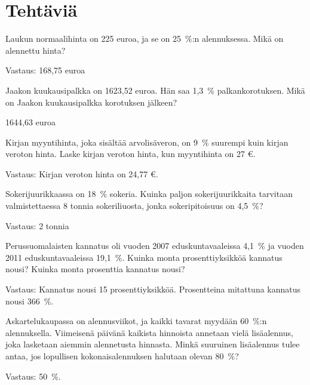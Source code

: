 \section*{Tehtäviä}

\begin{tehtava}
    Laukun normaalihinta on 225 euroa, ja se on 25~\%:n alennuksessa.
    Mikä on alennettu hinta?
    \begin{vastaus}
    Vastaus: 168,75 euroa
    \end{vastaus}
\end{tehtava}

\begin{tehtava}
    Jaakon kuukausipalkka on 1623,52 euroa. Hän saa 1,3~\% palkankorotuksen.
    Mikä on Jaakon kuukausipalkka korotuksen jälkeen?
    \begin{vastaus}
    1644,63 euroa
    \end{vastaus}
\end{tehtava}

\begin{tehtava}
    Kirjan myyntihinta, joka sisältää arvolisäveron, on 9~\% suurempi kuin kirjan veroton hinta. Laske kirjan veroton hinta, kun myyntihinta on 27 \euro.
    \begin{vastaus}
        Vastaus: Kirjan veroton hinta on 24,77 \euro.
    \end{vastaus}
\end{tehtava}

\begin{tehtava}
	Sokerijuurikkaassa on 18~\% sokeria. Kuinka paljon sokerijuurikkaita tarvitaan valmistettaessa 8 tonnia sokeriliuosta, jonka sokeripitoisuus on 4,5~\%?
	\begin{vastaus}
        Vastaus: 2 tonnia
    \end{vastaus}
\end{tehtava}

\begin{tehtava}
    Perussuomalaisten kannatus oli vuoden 2007 eduskuntavaaleissa 4,1~\% ja 
    vuoden 2011 eduskuntavaaleissa 19,1~\%. Kuinka monta prosenttiyksikköä 
    kannatus nousi? Kuinka monta prosenttia kannatus nousi?
    \begin{vastaus}
    Vastaus: Kannatus nousi 15 prosenttiyksikköä. Prosentteina mitattuna kannatus nousi 366~\%.
    \end{vastaus}
\end{tehtava}

\begin{tehtava}
    Askartelukaupassa on alennusviikot, ja kaikki tavarat myydään 60~\%:n 
    alennuksella. Viimeisenä päivänä kaikista hinnoista annetaan vielä 
    lisäalennus, joka lasketaan aiemmin alennetusta hinnasta. Minkä suuruinen 
    lisäalennus tulee antaa, jos lopullisen kokonaisalennuksen halutaan olevan 80~\%?
    \begin{vastaus}
        Vastaus: 50~\%.
    \end{vastaus}
\end{tehtava}

